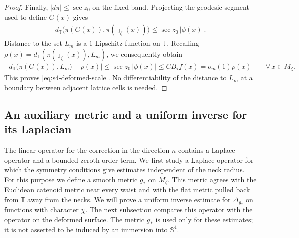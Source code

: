 \documentclass[a4paper,11pt,oneside,reqno]{amsart}
\numberwithin{equation}{section}
\theoremstyle{definition}
\begin{document}
\begin{proof}
    Finally, $|d\pi|\leq\sec z_0$ on the fixed band.
    Projecting the geodesic segment used to define
    $G(x)$ gives
    \begin{align*}
        d_{\mathbb T}\bigl(\pi(G(x)),
                         \pi(\jmath_\zeta(x))\bigr)
        \leq\sec z_0\,|\phi(x)|.
    \end{align*}
    Distance to the set $L_m$ is a $1$-Lipschitz
    function on $\mathbb T$. Recalling
    $\rho(x)=d_{\mathbb T}(\pi(\jmath_\zeta(x)),L_m)$,
    we consequently obtain
    \begin{align*}
        \left|d_{\mathbb T}\bigl(\pi(G(x)),L_m\bigr)
                        -\rho(x)\right|
        \leq\sec z_0\,|\phi(x)|\leq CB_\tau f(x)
         =o_m(1)\rho(x)
         \qquad\forall\,x\in M_\zeta.
    \end{align*}
    This proves \eqref{eq:s4-deformed-scale}. No
    differentiability of the distance to $L_m$ at a
    boundary between adjacent lattice cells is needed.
\end{proof}

\subsection{An auxiliary metric and a uniform inverse for its Laplacian}

The linear operator for the correction in the direction $n$
contains a Laplace operator and a bounded zeroth-order term.
We first study a Laplace operator for which the symmetry
conditions give estimates independent of the neck radius.
For this purpose we define a smooth metric $g_*$ on
$M_\zeta$. This metric agrees with the Euclidean catenoid
metric near every waist and with the flat metric pulled
back from $\mathbb T$ away from the necks. We will prove a
uniform inverse estimate for $\Delta_{g_*}$ on functions
with character $\chi$. The next subsection compares this
operator with the operator on the deformed surface.
The metric $g_*$ is used only for these estimates; it is
not asserted to be induced by an immersion into
$\mathbb S^4$.
\end{document}
